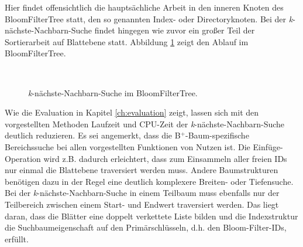 Hier findet offensichtlich die hauptsächliche Arbeit in den inneren Knoten des BloomFilterTree statt, den so genannten Index- oder Directoryknoten. Bei der \textit{k}-nächste-Nachbarn-Suche findet hingegen wie zuvor ein großer Teil der Sortierarbeit auf Blattebene statt. Abbildung \ref{fig:knn} zeigt den Ablauf im BloomFilterTree.
\begin{figure}[hpbt]
  \centering
  \\
  \caption[\textit{k}-nächste-Nachbarn-Suche im BloomFilterTree]{\textit{k}-nächste-Nachbarn-Suche im BloomFilterTree.}\label{fig:knn}
\end{figure}
Wie die Evaluation in Kapitel \ref{ch:evaluation} zeigt, lassen sich mit den vorgestellten Methoden Laufzeit und CPU-Zeit der \textit{k}-nächste-Nachbarn-Suche deutlich reduzieren. Es sei angemerkt, dass die B$^+$-Baum-spezifische Bereichssuche bei allen vorgestellten Funktionen von Nutzen ist. Die Einfüge-Operation wird z.B. dadurch erleichtert, dass zum Einsammeln aller freien IDs nur einmal die Blattebene traversiert werden muss. Andere Baumstrukturen benötigen dazu in der Regel eine deutlich komplexere Breiten- oder Tiefensuche. Bei der \textit{k}-nächste-Nachbarn-Suche in einem Teilbaum muss ebenfalls nur der Teilbereich zwischen einem Start- und Endwert traversiert werden. Das liegt daran, dass die Blätter eine doppelt verkettete Liste bilden und die Indexstruktur die Suchbaumeigenschaft auf den Primärschlüsseln, d.h. den Bloom-Filter-IDs, erfüllt.  

